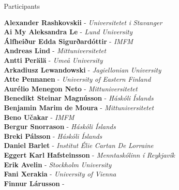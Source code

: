 \documentclass[12pt, openany, twoside]{report}      %
\begin{document}
\cleardoublepage

\newcommand\talk[3]{%
    \vspace{3 ex}
    \noindent
    \textsc{\large #1}

    \smallskip
    \noindent
    \textbf{\textit{#2}}

    \medskip
    \noindent
    #3

}




\pagebreak



\pagebreak





\newpage
{}

\noindent
{\LARGE Participants}

\bigskip
\bigskip
\noindent
\textbf{Alexander Rashkovskii} -
\textit{Universitetet i Stavanger}
\\
\textbf{Ai My Aleksandra Le} -
\textit{Lund University}
\\
\textbf{Álfheiður Edda Sigurðardóttir} -
\textit{IMFM}
\\
\textbf{Andreas Lind} -
\textit{Mittuniversitetet}
\\
\textbf{Antti Perälä} -
\textit{Umeå University}
\\
\textbf{Arkadiusz Lewandowski} -
\textit{Jagiellonian University}
\\
\textbf{Atte Pennanen} -
\textit{University of Eastern Finland}
\\
\textbf{Aurélio Menegon Neto} -
\textit{Mittuniversitetet}
\\
\textbf{Benedikt Steinar Magnússon} -
\textit{Háskóli Íslands}
\\
\textbf{Benjamin Marim de Moura} -
\textit{Mittuniversitetet}
\\
\textbf{Beno Učakar} -
\textit{IMFM}
\\
\textbf{Bergur Snorrason} -
\textit{Háskóli Íslands}
\\
\textbf{Breki Pálsson} -
\textit{Háskóli Íslands}
\\
\textbf{Daniel Barlet} -
\textit{Institut Élie Cartan De Lorraine}
\\
\textbf{Eggert Karl Hafsteinsson} -
\textit{Menntaskólinn í Reykjavík}
\\
\textbf{Erik Avelin} -
\textit{Stockholm University}
\\
\textbf{Fani Xerakia} -
\textit{University of Vienna}
\\
\textbf{Finnur Lárusson} -
\end{document}
